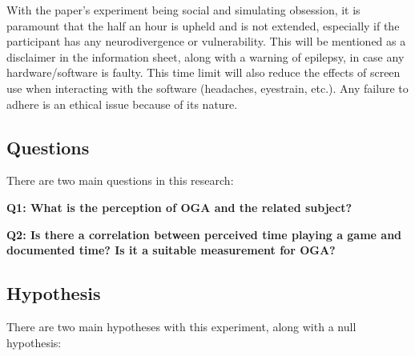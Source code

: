 \documentclass[conference]{IEEEtran}
\begin{document}
With the paper’s experiment being social and simulating obsession, it is paramount that the half an hour is upheld and is not extended, especially if the participant has any neurodivergence or vulnerability. This will be mentioned as a disclaimer in the information sheet, along with a warning of epilepsy, in case any hardware/software is faulty. This time limit will also reduce the effects of screen use when interacting with the software (headaches, eyestrain, etc.). Any failure to adhere is an ethical issue because of its nature. \\
\subsection{Questions}
There are two main questions in this research:

 \textbf{Q1: What is the perception of OGA and the related subject?}

 \textbf{Q2: Is there a correlation between perceived time playing a game and documented time? Is it a suitable measurement for OGA?}\\

\subsection{Hypothesis}
There are two main hypotheses with this experiment, along with a null hypothesis:

\begin{table}[H]
\centering
{}
\caption{Table 1 - The data collected from the experiment over two weeks.}
\label{data-table1}
\end{table}
\end{document}
